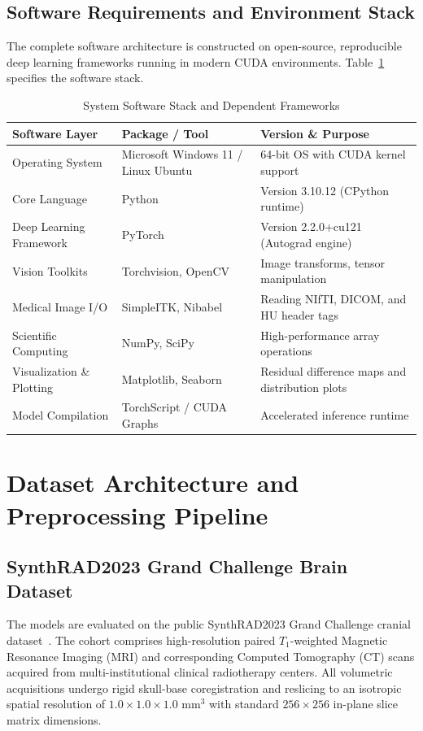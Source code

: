 \subsection{Software Requirements and Environment Stack}
The complete software architecture is constructed on open-source, reproducible deep learning frameworks running in modern CUDA environments. Table~\ref{tab:software_req} specifies the software stack.

\begin{table}[htbp]
\centering
\caption{System Software Stack and Dependent Frameworks}
\label{tab:software_req}
\small
\renewcommand{\arraystretch}{1.3}
\begin{tabularx}{\textwidth}{@{} l p{4.5cm} X @{}}
\toprule
\textbf{Software Layer} & \textbf{Package / Tool} & \textbf{Version \& Purpose} \\
\midrule
Operating System & Microsoft Windows 11 / Linux Ubuntu & 64-bit OS with CUDA kernel support \\
Core Language & Python & Version 3.10.12 (CPython runtime) \\
Deep Learning Framework & PyTorch & Version 2.2.0+cu121 (Autograd engine) \\
Vision Toolkits & Torchvision, OpenCV & Image transforms, tensor manipulation \\
Medical Image I/O & SimpleITK, Nibabel & Reading NIfTI, DICOM, and HU header tags \\
Scientific Computing & NumPy, SciPy & High-performance array operations \\
Visualization \& Plotting & Matplotlib, Seaborn & Residual difference maps and distribution plots \\
Model Compilation & TorchScript / CUDA Graphs & Accelerated inference runtime \\
\bottomrule
\end{tabularx}
\end{table}

\section{Dataset Architecture and Preprocessing Pipeline}

\subsection{SynthRAD2023 Grand Challenge Brain Dataset}
The models are evaluated on the public SynthRAD2023 Grand Challenge cranial dataset~\cite{thummerer2023synthrad2023}. The cohort comprises high-resolution paired $T_1$-weighted Magnetic Resonance Imaging (MRI) and corresponding Computed Tomography (CT) scans acquired from multi-institutional clinical radiotherapy centers. All volumetric acquisitions undergo rigid skull-base coregistration and reslicing to an isotropic spatial resolution of $1.0 \times 1.0 \times 1.0\text{ mm}^3$ with standard $256 \times 256$ in-plane slice matrix dimensions.

